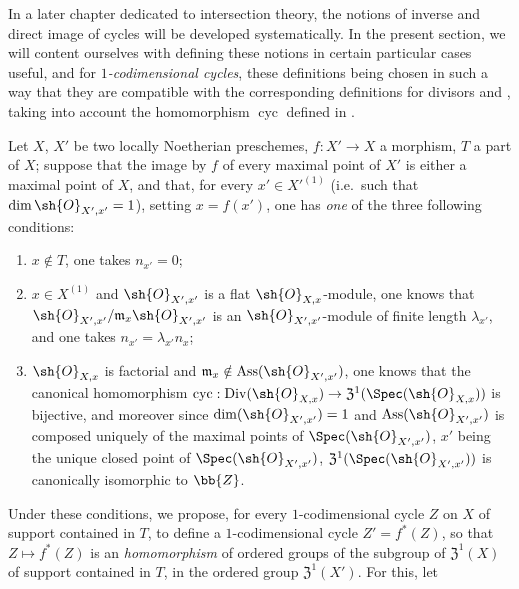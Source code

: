 
In a later chapter dedicated to intersection theory, the notions of inverse and direct image of cycles will be developed systematically.
In the present section, we will content ourselves with defining these notions in certain particular cases useful, and for \emph{$1$-codimensional cycles}, these definitions being chosen in such a way that they are compatible with the corresponding definitions for divisors  and , taking into account the homomorphism $\operatorname{cyc}$ defined in .

\begin{env}[21.10.1]
\label{IV.21.10.1}
Let $X$, $X'$ be two locally Noetherian preschemes, $f:X'\to X$ a morphism, $T$ a part of $X$;
suppose that the image by $f$ of every maximal point of $X'$ is either a maximal point of $X$, and that, for every $x'\in X'^{(1)}$ (i.e.\ such that $\dim\sh{O}_{X',x'}=1$), setting $x=f(x')$, one has \emph{one} of the three following conditions:
\begin{enumerate}
  \item[$1\textsuperscript{o}$] $x\notin T$, one takes $n_{x'}=0$;
  \item[$2\textsuperscript{o}$] $x\in X^{(1)}$ and $\sh{O}_{X',x'}$ is a flat $\sh{O}_{X,x}$-module, one knows  that $\sh{O}_{X',x'}/\mathfrak{m}_x\sh{O}_{X',x'}$ is an $\sh{O}_{X',x'}$-module of finite length $\lambda_{x'}$, and one takes $n_{x'}=\lambda_{x'}n_x$;
  \item[$3\textsuperscript{o}$] $\sh{O}_{X,x}$ is factorial and $\mathfrak{m}_x\notin\operatorname{Ass}(\sh{O}_{X',x'})$, one knows  that the canonical homomorphism $\operatorname{cyc}:\operatorname{Div}(\sh{O}_{X,x})\to\mathfrak{Z}^1(\Spec(\sh{O}_{X,x}))$ is bijective, and moreover since $\dim(\sh{O}_{X',x'})=1$ and $\operatorname{Ass}(\sh{O}_{X',x'})$ is composed uniquely of the maximal points of $\Spec(\sh{O}_{X',x'})$, $x'$ being the unique closed point of $\Spec(\sh{O}_{X',x'})$, $\mathfrak{Z}^1(\Spec(\sh{O}_{X',x'}))$ is canonically isomorphic to $\bb{Z}$.
\end{enumerate}
Under these conditions, we propose, for every $1$-codimensional cycle $Z$ on $X$ of support contained in $T$, to define a $1$-codimensional cycle $Z'=f^*(Z)$, so that $Z\mapsto f^*(Z)$ is an \emph{homomorphism} of ordered groups of the subgroup of $\mathfrak{Z}^1(X)$ of support contained in $T$, in the ordered group $\mathfrak{Z}^1(X')$.
For this, let
\[
\label{IV.21.10.1.1}
\]
\end{env}
